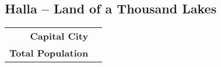 \subsection{Halla -- Land of a Thousand Lakes}
\begin{tabular}{r | l}
    \textbf{Capital City} & \\
    \textbf{Total Population} & 
\end{tabular}